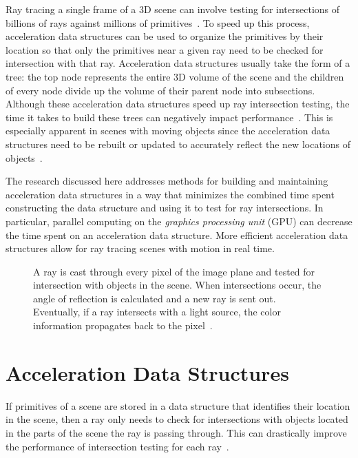 \documentclass{sig-alternate}
\begin{document}
Ray tracing a single frame of a 3D scene can involve testing for intersections of billions of rays against millions of primitives~\cite{Gribble:2012, Wald:2007}. To speed up this process, acceleration data structures can be used to organize the primitives by their location so that only the primitives near a given ray need to be checked for intersection with that ray. Acceleration data structures usually take the form of a tree: the top node represents the entire 3D volume of the scene and the children of every node divide up the volume of their parent node into subsections. Although these acceleration data structures speed up ray intersection testing, the time it takes to build these trees can negatively impact performance~\cite{Garanzha:2011}. This is especially apparent in scenes with moving objects since the acceleration data structures need to be rebuilt or updated to accurately reflect the new locations of objects~\cite{Wald:2007}.

The research discussed here addresses methods for building and maintaining acceleration data structures in a way that minimizes the combined time spent constructing the data structure and using it to test for ray intersections. In particular, parallel computing on the \emph{graphics processing unit} (GPU) can decrease the time spent on an acceleration data structure. More efficient acceleration data structures allow for ray tracing scenes with motion in real time.

\begin{figure}
\centering
{}
\caption{A ray is cast through every pixel of the image plane and tested for intersection with objects in the scene. When intersections occur, the angle of reflection is calculated and a new ray is sent out. Eventually, if a ray intersects with a light source, the color information propagates back to the pixel~\cite{Gribble:2012, wiki:rayTracing}.}
\label{fig:ray_diagram}
\end{figure}

\section{Acceleration Data Structures}
\label{sec:accel}

If primitives of a scene are stored in a data structure that identifies their location in the scene, then a ray only needs to check for intersections with objects located in the parts of the scene the ray is passing through. This can drastically improve the performance of intersection testing for each ray~\cite{wiki:rayTracing}.
\end{document}
